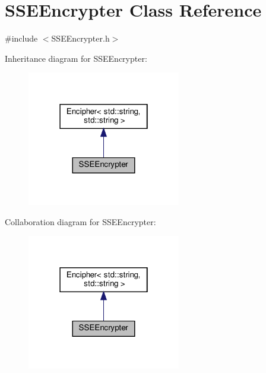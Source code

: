 \hypertarget{classSSEEncrypter}{}\section{S\+S\+E\+Encrypter Class Reference}
\label{classSSEEncrypter}


{\ttfamily \#include $<$S\+S\+E\+Encrypter.\+h$>$}



Inheritance diagram for S\+S\+E\+Encrypter\+:
\nopagebreak
\begin{figure}[H]
\begin{center}
\leavevmode
\includegraphics[width=190pt]{classSSEEncrypter__inherit__graph}
\end{center}
\end{figure}


Collaboration diagram for S\+S\+E\+Encrypter\+:
\nopagebreak
\begin{figure}[H]
\begin{center}
\leavevmode
\includegraphics[width=190pt]{classSSEEncrypter__coll__graph}
\end{center}
\end{figure}

